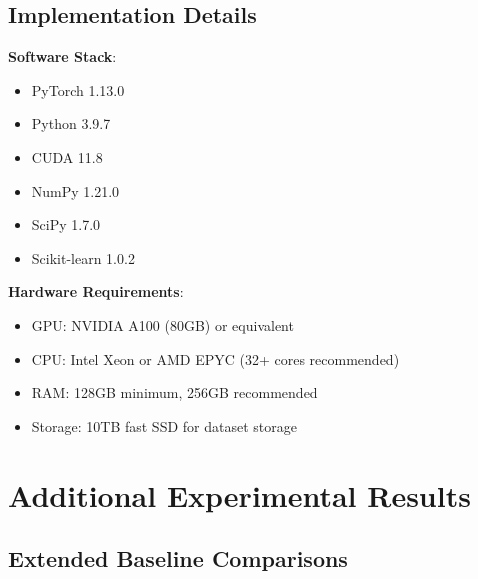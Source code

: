 \documentclass[11pt]{article}
\begin{document}
\subsection{Implementation Details}

\textbf{Software Stack}:
\begin{itemize}
    \item PyTorch 1.13.0
    \item Python 3.9.7
    \item CUDA 11.8
    \item NumPy 1.21.0
    \item SciPy 1.7.0
    \item Scikit-learn 1.0.2
\end{itemize}

\textbf{Hardware Requirements}:
\begin{itemize}
    \item GPU: NVIDIA A100 (80GB) or equivalent
    \item CPU: Intel Xeon or AMD EPYC (32+ cores recommended)
    \item RAM: 128GB minimum, 256GB recommended
    \item Storage: 10TB fast SSD for dataset storage
\end{itemize}

\section{Additional Experimental Results}
\label{app:results}

\subsection{Extended Baseline Comparisons}
\end{document}
